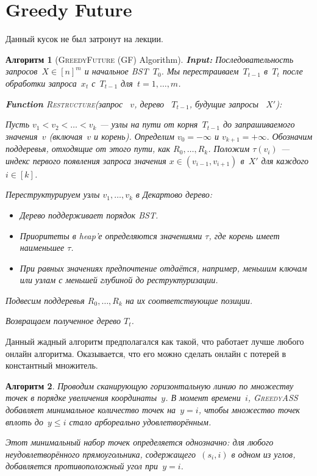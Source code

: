 \documentclass[a4paper,11pt]{article}
\newtheorem{algo}{Алгоритм}
\begin{document}
\section{Greedy Future}

Данный кусок не был затронут на лекции.

\begin{algo} [\textsc{GreedyFuture} (\textsc{GF}) Algorithm] \label{algorithm:greedy_future}
    \textbf{Input:} Последовательность запросов~$X \in [n]^m$ и начальное BST~$T_0$. 
    Мы перестраиваем~$T_{t-1}$ в~$T_t$ после обработки запроса~$x_t$ с~$T_{t-1}$ для~$t = 1, \dots, m$.

    \textbf{Function} \textsc{Restructure}(\textit{запрос }~$v$, \textit{дерево }~$T_{t-1}$, \textit{будущие запросы }~$X'$):

    \begin{algorithmic}[1]
        \State Пусть $v_1 < v_2 < \dots < v_k$ — узлы на пути от корня~$T_{t-1}$ до запрашиваемого значения~$v$ (включая~$v$ и корень). 
        \State Определим $v_0 = -\infty$ и $v_{k+1} = +\infty$.
        \State Обозначим поддеревья, отходящие от этого пути, как $R_0, \dots, R_k$.
		\State Положим $\tau(v_i)$ — индекс первого появления запроса значения $x \in (v_{i-1}, v_{i+1})$ в~$X'$ для каждого $i \in [k]$.

        \State Переструктурируем узлы $v_1, \dots, v_k$ в Декартово дерево:
        \begin{itemize}
            \item Дерево поддерживает порядок BST.
            \item Приоритеты в heap'е определяются значениями $\tau$, где корень имеет наименьшее $\tau$.
            \item При равных значениях предпочтение отдаётся, например, меньшим ключам или узлам с меньшей глубиной до реструктуризации.
        \end{itemize}
        
        \State Подвесим поддеревья $R_0, \dots, R_k$ на их соответствующие позиции.
        
        \State Возвращаем полученное дерево $T_t$.
    \end{algorithmic}
\end{algo}

Данный жадный алгоритм предполагался как такой, что работает лучше любого онлайн алгоритма.
Оказывается, что его можно сделать онлайн с потерей в константный множитель.

\begin{algo} \label{algorithm:greedy_ass}
Проводим сканирующую горизонтальную линию по множеству точек в порядке увеличения координаты~$y$. В момент времени~$i$, \textsc{GreedyASS} добавляет минимальное количество точек на~$y = i$, чтобы множество точек вплоть до~$y \leq i$ стало арбореально удовлетворённым.

\textit{Этот минимальный набор точек определяется однозначно: для любого неудовлетворённого прямоугольника, содержащего~$(s_i, i)$ в одном из углов, добавляется противоположный угол при~$y = i$.}
\end{algo}
\end{document}
